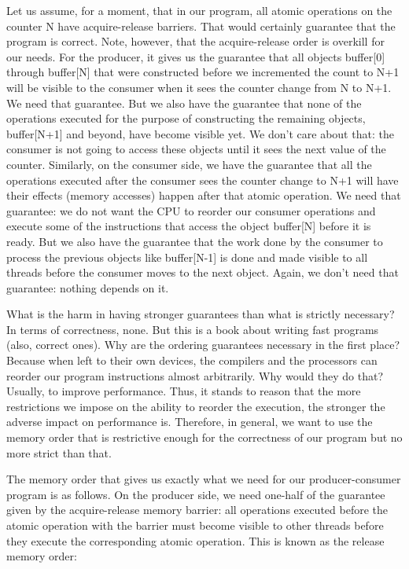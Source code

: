 Let us assume, for a moment, that in our program, all atomic operations on the counter N have acquire-release barriers. That would certainly guarantee that the program is correct. Note, however, that the acquire-release order is overkill for our needs. For the producer, it gives us the guarantee that all objects buffer[0] through buffer[N] that were constructed before we incremented the count to N+1 will be visible to the consumer when it sees the counter change from N to N+1. We need that guarantee. But we also have the guarantee that none of the operations executed for the purpose of constructing the remaining objects, buffer[N+1] and beyond, have become visible yet. We don't care about that: the consumer is not going to access these objects until it sees the next value of the counter. Similarly, on the consumer side, we have the guarantee that all the operations executed after the consumer sees the counter change to N+1 will have their effects (memory accesses) happen after that atomic operation. We need that guarantee: we do not want the CPU to reorder our consumer operations and execute some of the instructions that access the object buffer[N] before it is ready. But we also have the guarantee that the work done by the consumer to process the previous objects like buffer[N-1] is done and made visible to all threads before the consumer moves to the next object. Again, we don't need that guarantee: nothing depends on it.

What is the harm in having stronger guarantees than what is strictly necessary? In terms of correctness, none. But this is a book about writing fast programs (also, correct ones). Why are the ordering guarantees necessary in the first place? Because when left to their own devices, the compilers and the processors can reorder our program instructions almost arbitrarily. Why would they do that? Usually, to improve performance. Thus, it stands to reason that the more restrictions we impose on the ability to reorder the execution, the stronger the adverse impact on performance is. Therefore, in general, we want to use the memory order that is restrictive enough for the correctness of our program but no more strict than that.

The memory order that gives us exactly what we need for our producer-consumer program is as follows. On the producer side, we need one-half of the guarantee given by the acquire-release memory barrier: all operations executed before the atomic operation with the barrier must become visible to other threads before they execute the corresponding atomic operation. This is known as the release memory order:

